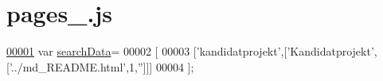 \hypertarget{pages__1_8js_source}{}\section{pages\+\_.\+js}
\label{pages__1_8js_source}

\begin{DoxyCode}
\hypertarget{pages__1_8js_source.tex_l00001}{}\hyperlink{pages__1_8js_ad01a7523f103d6242ef9b0451861231e}{00001} var \hyperlink{pages__1_8js_ad01a7523f103d6242ef9b0451861231e}{searchData}=
00002 [
00003   [\textcolor{stringliteral}{'kandidatprojekt'},[\textcolor{stringliteral}{'Kandidatprojekt'},[\textcolor{stringliteral}{'../md\_README.html'},1,\textcolor{stringliteral}{''}]]]
00004 ];
\end{DoxyCode}
